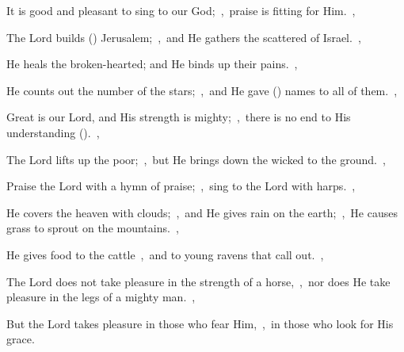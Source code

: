 \documentclass[12pt,twoside,a5paper]{article}
\begin{document}
\begin{normalparskip}
  It is good and pleasant to sing to our God;~\sep\ praise is fitting for Him.~\sep


  The Lord builds () Jerusalem;~\sep\ and He gathers the scattered of Israel.~\sep

  He heals the broken-hearted; and He binds up their pains.~\sep

  He counts out the number of the stars;~\sep\ and He gave () names to all of them.~\sep

  Great is our Lord, and His strength is mighty;~\sep\ there is no end to His understanding ().~\sep

  The Lord lifts up the poor;~\sep\ but He brings down the wicked to the ground.~\sep

  Praise the Lord with a hymn of praise;~\sep\ sing to the Lord with harps.~\sep

  He covers the heaven with clouds;~\sep\ and He gives rain on the earth;~\sep\ He causes grass to sprout on the mountains.~\sep

  He gives food to the cattle~\sep\ and to young ravens that call out.~\sep

  The Lord does not take pleasure in the strength of a horse,~\sep\ nor does He take pleasure in the legs of a mighty man.~\sep

  But the Lord takes pleasure in those who fear Him,~\sep\ in those who look for His grace.
\end{normalparskip}



\end{document}

